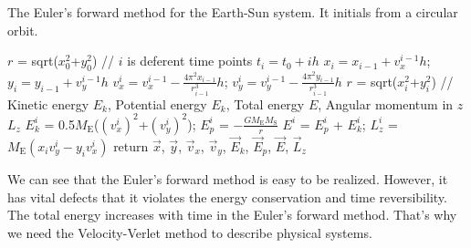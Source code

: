 \begin{algorithm}[tb]
	\caption{The Euler's forward method for the Earth-Sun system. It initials from a circular orbit.}
	\label{alg::euler}
	$r$ = sqrt($x_0^2$+$y_0^2$)\;
	// $i$ is deferent time points $t_i=t_0+ih$\;
    { $x_{i} = x_{i-1} + v_x^{{i-1}}h$;
    $y_{i} = y_{i-1} + v_y^{{i-1}}h$\;
    $v_x^{i} = v_x^{i-1} - \frac{4\pi^2x_{i-1}}{r_{i-1}^3}h$;
    $v_y^{i} = v_y^{i-1} - \frac{4\pi^2y_{i-1}}{r_{i-1}^3}h$\;
    $r$ = sqrt($x_i^2$+$y_i^2$)\;
    // Kinetic energy $E_k$, Potential energy $E_k$, Total energy $E$, Angular momentum in $\hat{z}$ $L_z$\;
    $E_k^i$ = 0.5$M_{\mathrm{E}}$($(v_x^{i})^2$+$(v_y^{i})^2$);
    $E_p^i$ = $-\frac{GM_{\mathrm{E}}M_{\mathrm{S}}}{r}$\;
    $E^i$ = $E_p^i$ + $E_k^i$;
    $L_z^i$ = $M_{\mathrm{E}}(x_iv_y^{i}-y_iv_x^{i})$\;
    }
	return $\vec{x}$, $\vec{y}$, $\vec{v}_x$, $\vec{v}_y$, $\vec{E}_k$, $\vec{E}_p$, $\vec{E}$, $\vec{L}_z$\;
\end{algorithm}

We can see that the Euler's forward method is easy to be realized.
 However, it has vital defects that it violates the energy conservation and time reversibility.
 The total energy increases with time in the Euler's forward method.
 That's why we need the Velocity-Verlet method to describe physical systems.
